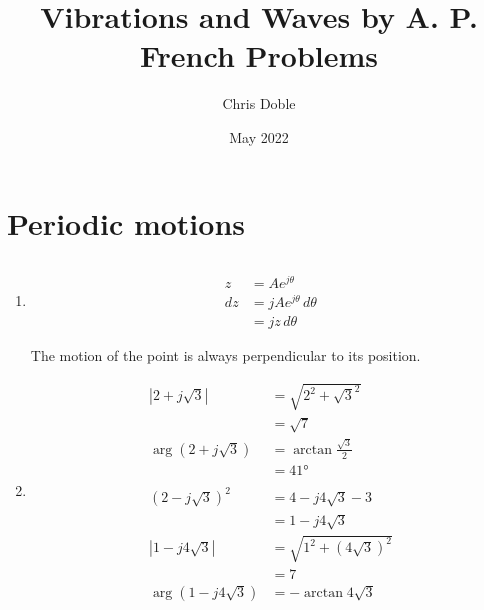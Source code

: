 \documentclass{article}
\title{Vibrations and Waves by A. P. French Problems}
\author{Chris Doble}
\date{May 2022}
\begin{document}
\maketitle

\tableofcontents

\section{Periodic motions}

\setcounter{subsection}{3}
\subsection{}

\begin{enumerate}
  \item

        \begin{align*}
          z   & = A e^{j \theta}              \\
          d z & = j A e^{j \theta} \,d \theta \\
              & = j z \,d \theta
        \end{align*}

        The motion of the point is always perpendicular to its position.

  \item

        \begin{align*}
          |2 + j \sqrt{3}|        & = \sqrt{2^2 + \sqrt{3}^2}     \\
                                  & = \sqrt{7}                    \\
          \arg (2 + j \sqrt{3})   & = \arctan \frac{\sqrt{3}}{2}  \\
                                  & = \ang{41}                    \\ \\
          (2 - j \sqrt{3})^2      & = 4 - j 4 \sqrt{3} - 3        \\
                                  & = 1 - j 4 \sqrt{3}            \\
          |1 - j 4 \sqrt{3}|      & = \sqrt{1^2 + (4 \sqrt{3})^2} \\
                                  & = 7                           \\
          \arg (1 - j 4 \sqrt{3}) & = -\arctan 4 \sqrt{3}
        \end{align*}
\end{enumerate}
\end{document}
